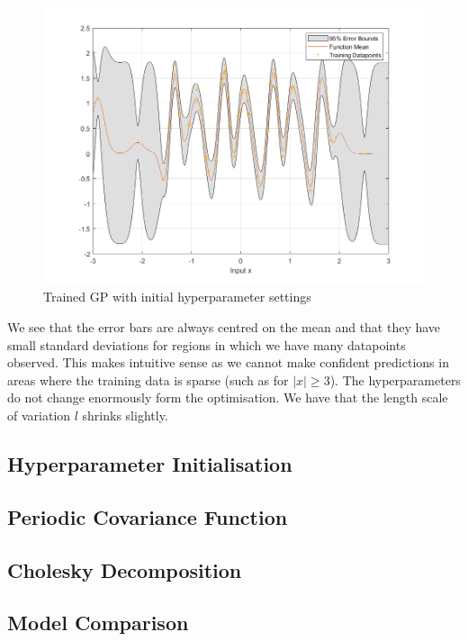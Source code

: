 \documentclass[]{article}
\newcommand{\figwidth}{0.6\linewidth}
\begin{document}
\begin{figure}[!h]
	\centering
	\includegraphics[width=\figwidth]{1a}
	\caption{Trained GP with initial hyperparameter settings}
	\label{fig:1a}
\end{figure}
%
We see that the error bars are always centred on the mean and that they have small standard deviations for regions in which we have many datapoints observed. This makes intuitive sense as we cannot make confident predictions in areas where the training data is sparse (such as for $|x| \geq 3$). The hyperparameters do not change enormously form the optimisation. We have that the length scale of variation $l$ shrinks slightly.
\subsection{Hyperparameter Initialisation}
\subsection{Periodic Covariance Function}
\subsection{Cholesky Decomposition}
\subsection{Model Comparison}
\end{document}
